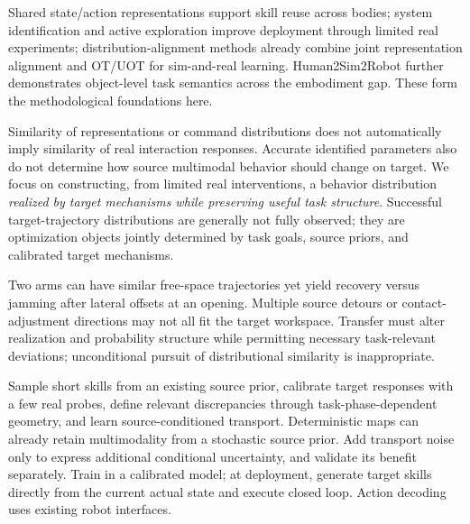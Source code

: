 \documentclass[11pt]{article}
\begin{document}
Shared state/action representations support skill reuse across bodies\cite{lsa,lad,xskill}; system identification and active exploration improve deployment through limited real experiments\cite{asid,spi,optimalexploration}; distribution-alignment methods already combine joint representation alignment and OT/UOT for sim-and-real learning\cite{otreal}. Human2Sim2Robot further demonstrates object-level task semantics across the embodiment gap\cite{human2sim}. These form the methodological foundations here.

Similarity of representations or command distributions does not automatically imply similarity of real interaction responses. Accurate identified parameters also do not determine how source multimodal behavior should change on target. We focus on constructing, from limited real interventions, a behavior distribution \emph{realized by target mechanisms while preserving useful task structure}. Successful target-trajectory distributions are generally not fully observed; they are optimization objects jointly determined by task goals, source priors, and calibrated target mechanisms.

Two arms can have similar free-space trajectories yet yield recovery versus jamming after lateral offsets at an opening. Multiple source detours or contact-adjustment directions may not all fit the target workspace. Transfer must alter realization and probability structure while permitting necessary task-relevant deviations; unconditional pursuit of distributional similarity is inappropriate.

Sample short skills from an existing source prior, calibrate target responses with a few real probes, define relevant discrepancies through task-phase-dependent geometry, and learn source-conditioned transport. Deterministic maps can already retain multimodality from a stochastic source prior. Add transport noise only to express additional conditional uncertainty, and validate its benefit separately. Train in a calibrated model; at deployment, generate target skills directly from the current actual state and execute closed loop. Action decoding uses existing robot interfaces.
\end{document}
